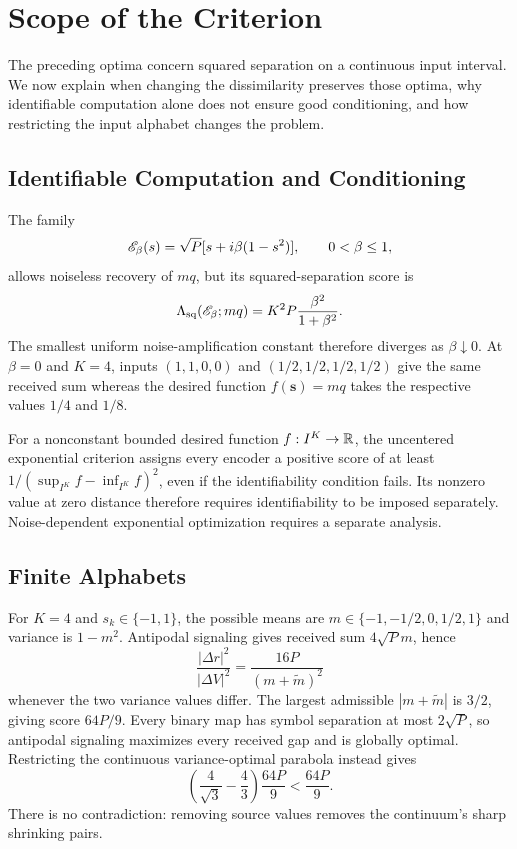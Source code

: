 \section{Scope of the Criterion}\label{app:boundaries}
The preceding optima concern squared separation on a continuous input interval. We now explain when changing the dissimilarity preserves those optima, why identifiable computation alone does not ensure good conditioning, and how restricting the input alphabet changes the problem.

\subsection{Identifiable Computation and Conditioning}
The family
$$\mathscr E_\beta(s)=\sqrt P[s+i\beta(1-s^2)],\qquad0<\beta\le1,$$
allows noiseless recovery of $mq$, but its squared-separation score is
$$\Lambda_{\mathrm{sq}}(\mathscr E_\beta;mq)=K^2P\frac{\beta^2}{1+\beta^2}.$$
The smallest uniform noise-amplification constant therefore diverges as $\beta\downarrow0$. At $\beta=0$ and $K=4$, inputs $(1,1,0,0)$ and $(1/2,1/2,1/2,1/2)$ give the same received sum whereas the desired function $f(\mathbf s)=mq$ takes the respective values $1/4$ and $1/8$.

For a nonconstant bounded desired function $f:I^K\to\mathbb R$, the uncentered exponential criterion assigns every encoder a positive score of at least $1/(\sup_{I^K}f-\inf_{I^K}f)^2$, even if the identifiability condition fails. Its nonzero value at zero distance therefore requires identifiability to be imposed separately. Noise-dependent exponential optimization requires a separate analysis.

\subsection{Finite Alphabets}
For $K=4$ and $s_k\in\{-1,1\}$, the possible means are $m\in\{-1,-1/2,0,1/2,1\}$ and variance is $1-m^2$. Antipodal signaling gives received sum $4\sqrt P m$, hence
$$\frac{|\Delta r|^2}{|\Delta V|^2}=\frac{16P}{(m+\widetilde m)^2}$$
whenever the two variance values differ. The largest admissible $|m+\widetilde m|$ is $3/2$, giving score $64P/9$. Every binary map has symbol separation at most $2\sqrt P$, so antipodal signaling maximizes every received gap and is globally optimal. Restricting the continuous variance-optimal parabola instead gives
$$\left(\frac4{\sqrt3}-\frac43\right)\frac{64P}{9}<\frac{64P}{9}.$$
There is no contradiction: removing source values removes the continuum's sharp shrinking pairs.
